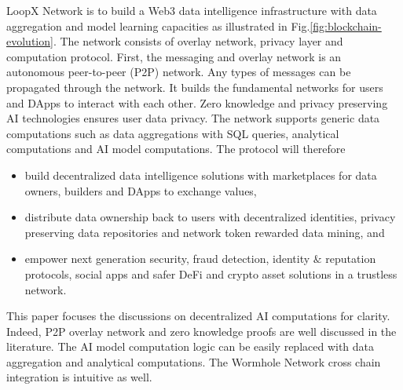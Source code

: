 \documentclass[11pt,letterpaper]{article}
\begin{document}
LoopX Network is to build a Web3 data intelligence infrastructure with data aggregation and model learning capacities as illustrated in Fig.\ref{fig:blockchain-evolution}. The network consists of overlay network, privacy layer and computation protocol. First, the messaging and overlay network is an autonomous peer-to-peer (P2P) network. Any types of messages can be propagated through the network. It builds the fundamental networks for users and DApps to interact with each other. Zero knowledge and privacy preserving AI technologies ensures user data privacy. The network supports generic data computations such as data aggregations with SQL queries, analytical computations and AI model computations. The protocol will therefore
\begin{itemize}
    \item build decentralized data intelligence solutions with marketplaces for data owners, builders and DApps to exchange values,
    \item distribute data ownership back to users with decentralized identities, privacy preserving data repositories and network token rewarded data mining, and
    \item empower next generation security, fraud detection, identity $\&$ reputation protocols, social apps and safer DeFi and crypto asset solutions in a trustless network.
\end{itemize}

This paper focuses the discussions on decentralized AI computations for clarity. Indeed, P2P overlay network and zero knowledge proofs are well discussed in the literature. The AI model computation logic can be easily replaced with data aggregation and analytical computations. The Wormhole Network cross chain integration is intuitive as well.
\end{document}
